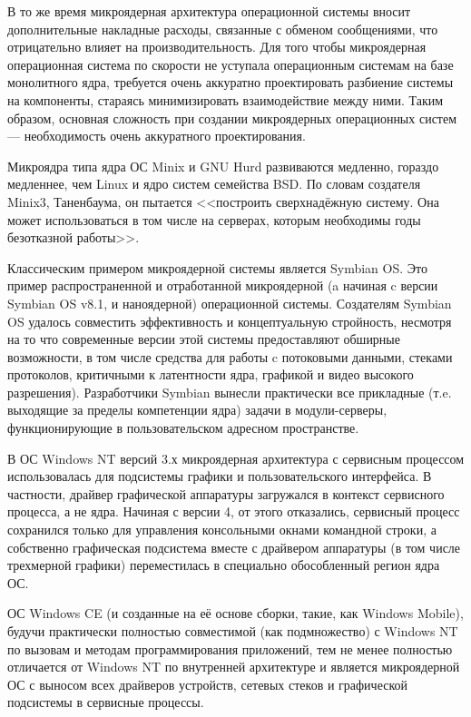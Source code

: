 В то же время микроядерная архитектура операционной системы вносит дополнительные накладные расходы, связанные с обменом сообщениями, что отрицательно влияет на производительность. Для того чтобы микроядерная операционная система по скорости не уступала операционным системам на базе монолитного ядра, требуется очень аккуратно проектировать разбиение системы на компоненты, стараясь минимизировать взаимодействие между ними. Таким образом, основная сложность при создании микроядерных операционных систем --- необходимость очень аккуратного проектирования.

Микроядра типа ядра ОС Minix и GNU Hurd развиваются медленно, гораздо медленнее, чем Linux и ядро систем семейства BSD. По словам создателя Minix3, Таненбаума, он пытается <<построить сверхнадёжную систему. Она может использоваться в том числе на серверах, которым необходимы годы безотказной работы>>.

Классическим примером микроядерной системы является Symbian OS. Это пример распространенной и отработанной микроядерной (a начиная c версии Symbian OS v8.1, и наноядерной) операционной системы. Создателям Symbian OS удалось совместить эффективность и концептуальную стройность, несмотря на то что современные версии этой системы предоставляют обширные возможности, в том числе средства для работы c потоковыми данными, стеками протоколов, критичными к латентности ядра, графикой и видео высокого разрешения).
Разработчики Symbian вынесли практически все прикладные (т.e. выходящие за пределы компетенции ядра) задачи в модули-серверы, функционирующие в пользовательском адресном пространстве.

В ОС Windows NT версий 3.х микроядерная архитектура с сервисным процессом использовалась для подсистемы графики и пользовательского интерфейса. В частности, драйвер графической аппаратуры загружался в контекст сервисного процесса, а не ядра.
Начиная с версии 4, от этого отказались, сервисный процесс сохранился только для управления консольными окнами командной строки, а собственно графическая подсистема вместе с драйвером аппаратуры (в том числе трехмерной графики) переместилась в специально обособленный регион ядра ОС.

ОС Windows CE (и созданные на её основе сборки, такие, как Windows Mobile), будучи практически полностью совместимой (как подмножество) с Windows NT по вызовам и методам программирования приложений, тем не менее полностью отличается от Windows NT по внутренней архитектуре и является микроядерной ОС с выносом всех драйверов устройств, сетевых стеков и графической подсистемы в сервисные процессы.

